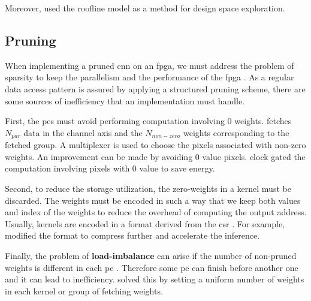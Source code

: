 Moreover, \textcite{liu_fpga-based_2019} used the roofline model as a method for design space exploration.
%
%
\subsection{Pruning} \label{subsec:impl_prun}
%
%
When implementing a pruned \acrshort{cnn} on an \acrshort{fpga}, we must address the problem of sparsity to keep the parallelism and the performance of the \acrshort{fpga} \cite{zhu_efficient_2020}. As a regular data access pattern is assured by applying a structured pruning scheme, there are some sources of inefficiency that an implementation must handle.

First, the \acrshort{pe}s must avoid performing computation involving 0 weights. \textcite{kang_accelerator-aware_2020} fetches $N_{par}$ data in the channel axis and the $N_{non-zero}$ weights corresponding to the fetched group. A multiplexer is used to choose the pixels associated with non-zero weights. An improvement can be made by avoiding 0 value pixels. \textcite{zhu_efficient_2020} clock gated the computation involving pixels with 0 value to save energy.

Second, to reduce the storage utilization, the zero-weights in a kernel must be discarded. The weights must be encoded in such a way that we keep both values and index of the weights to reduce the overhead of computing the output address.  Usually, kernels are encoded in a format derived from the \acrfull{csr} \cite{mao_exploring_2017}. For example, \cite{zhu_efficient_2020} modified the format to compress further and accelerate the inference.

Finally, the problem of \textbf{load-imbalance} can arise if the number of non-pruned weights is different in each \acrshort{pe} \cite{kim_zena_2018}. Therefore some \acrshort{pe} can finish before another one and it can lead to inefficiency. \textcite{zhu_efficient_2020, kang_accelerator-aware_2020} solved this by setting a uniform number of weights in each kernel or group of fetching weights.
